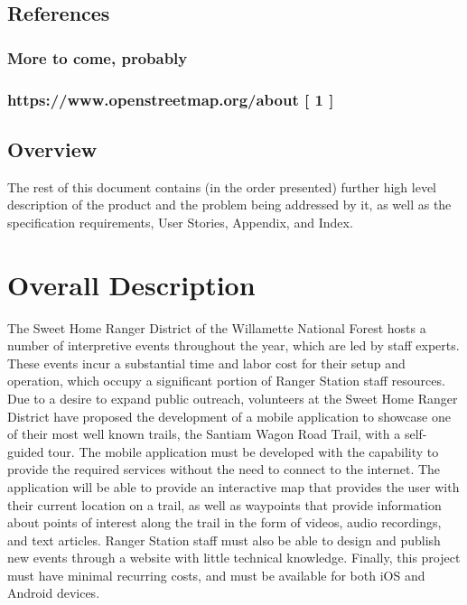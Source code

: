 \documentclass[letterpaper,10pt,titlepage]{article}
\begin{document}
\subsection{References}
\subsubsection{More to come, probably}
\subsubsection{https://www.openstreetmap.org/about [ 1 ]}
\vspace{0.3cm}

\subsection{Overview}
The rest of this document contains (in the order presented) further high level description of the product and the problem being addressed by it, as well as the specification requirements, User Stories, Appendix, and Index. 



\section{Overall Description}
The Sweet Home Ranger District of the Willamette National Forest hosts a number of interpretive events throughout the year, which are led by staff experts. These events incur a substantial time and labor  cost for their setup and operation, which occupy a significant portion of Ranger Station staff resources.  Due to a desire to expand public outreach, volunteers at the Sweet Home Ranger District have proposed the development of a mobile application to showcase one of their most well known trails, the Santiam Wagon Road Trail, with a self-guided tour. The mobile application must be developed with the capability to provide the required services without the need to connect to the internet. The application will be able to provide an interactive map that provides the user with their current location on a trail, as well as waypoints that provide information about points of interest along the trail in the form of videos, audio recordings, and text articles. Ranger Station staff must also be able to design and publish new events through a website with little technical knowledge. Finally, this project must have minimal recurring costs, and must be available for both iOS and Android devices.
\end{document}
